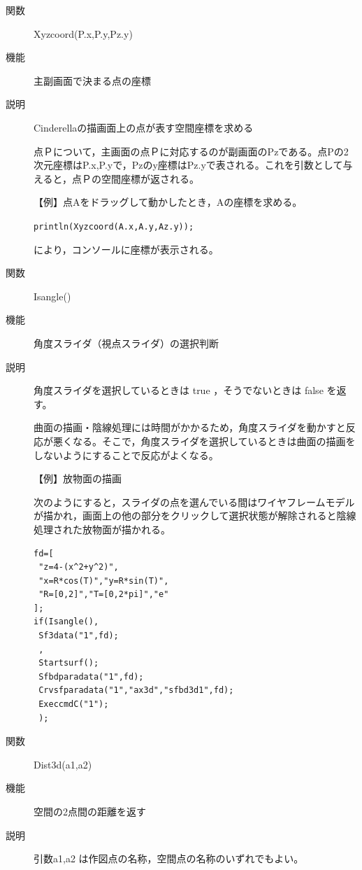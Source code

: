 \documentclass[papersize,a4paper,12pt,uplatex]{jsarticle}
\begin{document}
\begin{description}
\vspace{\baselineskip}
\hypertarget{xyzcoord}{}
\item[関数]Xyzcoord(P.x,P.y,Pz.y)
\item[機能]主副画面で決まる点の座標
\item[説明]Cinderellaの描画面上の点が表す空間座標を求める

点Ｐについて，主画面の点Ｐに対応するのが副画面のPzである。点Pの2次元座標はP.x,P.yで，Pzのy座標はPz.yで表される。これを引数として与えると，点Ｐの空間座標が返される。

\vspace{\baselineskip}
【例】点Aをドラッグして動かしたとき，Aの座標を求める。

\verb|println(Xyzcoord(A.x,A.y,Az.y));|

により，コンソールに座標が表示される。

\vspace{\baselineskip}
\hypertarget{isangle}{}
\item[関数]Isangle()
\item[機能]角度スライダ（視点スライダ）の選択判断
\item[説明]角度スライダを選択しているときは true ，そうでないときは false を返す。

曲面の描画・陰線処理には時間がかかるため，角度スライダを動かすと反応が悪くなる。そこで，角度スライダを選択しているときは曲面の描画をしないようにすることで反応がよくなる。

\vspace{\baselineskip}
【例】放物面の描画

次のようにすると，スライダの点を選んでいる間はワイヤフレームモデルが描かれ，画面上の他の部分をクリックして選択状態が解除されると陰線処理された放物面が描かれる。
\begin{verbatim}
fd=[
 "z=4-(x^2+y^2)",
 "x=R*cos(T)","y=R*sin(T)",
 "R=[0,2]","T=[0,2*pi]","e"
];
if(Isangle(),
 Sf3data("1",fd);
 ,
 Startsurf();
 Sfbdparadata("1",fd);
 Crvsfparadata("1","ax3d","sfbd3d1",fd);
 ExeccmdC("1");
 );
\end{verbatim}

\hypertarget{dist3d}{}
\item[関数]Dist3d(a1,a2)
\item[機能]空間の2点間の距離を返す
\item[説明]引数a1,a2 は作図点の名称，空間点の名称のいずれでもよい。


\end{description}
\end{document}
